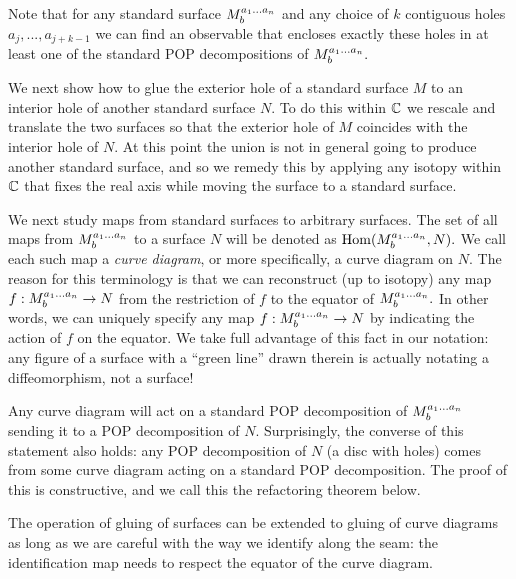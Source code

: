 \documentclass[aps, prl, letterpaper, twocolumn, superscriptaddress, notitlepage, 10pt]{revtex4-1}
\begin{document}
Note that for any standard surface $M^{a_1...a_n}_{b}$ 
and any choice of $k$ contiguous holes $a_j,...,a_{j+k-1}$
we can find an observable that encloses exactly these holes
in at least one of the standard POP decompositions of $M^{a_1...a_n}_{b}.$ 

We next show how to glue the exterior hole of
a standard surface $M$
to an interior hole of another standard surface $N.$
To do this within $\mathbb{C}$ we rescale and translate the two surfaces so
that the exterior hole of $M$ coincides with the interior hole of $N.$
At this point the union is not in general going to
produce another standard surface,
and so we remedy this by applying any isotopy within $\mathbb{C}$
that fixes the real axis while moving the surface to a standard surface.

We next study maps from standard surfaces to arbitrary surfaces.
The set of all maps from $M^{a_1...a_n}_{b}$ 
to a surface $N$ will be denoted as ${\mathrm{Hom}}(M^{a_1...a_n}_{b}, N).$ 
We call each such map a \emph{curve diagram},
or more specifically, a curve diagram on $N$.
The reason for this terminology is that we can reconstruct (up to isotopy)
any map $f:M^{a_1...a_n}_{b}\to N$ from
the restriction of $f$ to the equator of $M^{a_1...a_n}_{b}.$ 
In other words, we can uniquely specify any map
$f:M^{a_1...a_n}_{b}\to N$ by indicating the action of
$f$ on the equator. We take full advantage of this
fact in our notation: any figure of a surface
with a ``green line'' drawn therein is actually notating a 
diffeomorphism, not a surface!

Any curve diagram will act on a standard POP decomposition
of $M^{a_1...a_n}_{b}$ sending it to a POP decomposition of $N.$
Surprisingly, the converse of this statement also holds:
any POP decomposition of $N$ (a disc with holes)
comes from some curve diagram
acting on a standard POP decomposition.
The proof of this is constructive, and we call this
the refactoring theorem below. %

The operation of 
gluing of surfaces can be extended to gluing of curve diagrams as
long as we are careful with the way we identify along the seam:
the identification map needs to respect the equator of the curve
diagram.
\end{document}
